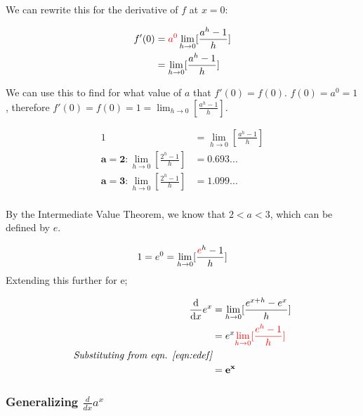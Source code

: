 \documentclass[12pt]{article}
\begin{document}
We can rewrite this for the derivative of $f$ at $x = 0$:

\begin{equation}\label{eqn:expderiv}
    \begin{split}
    f'(0) &= \textcolor{red}{a^0}\lim_{h\to 0}[\frac{a^h-1}{h}]\\
    &=\lim_{h\to 0}[\frac{a^h-1}{h}]
    \end{split}
\end{equation}

We can use this to find for what value of $a$ that $f'(0) = f(0)$. $f(0) = a^0 = 1$, therefore $f'(0) = f(0) = 1 = \lim_{h\to 0}[\frac{a^h-1}{h}]$.

\begin{equation}
    \begin{split}
        1 &= \lim_{h\to 0}[\frac{a^h-1}{h}]\\
        \mathbf{a = 2:} \lim_{h\to 0}[\frac{2^h-1}{h}] &= 0.693...\\
        \mathbf{a = 3:} \lim_{h\to 0}[\frac{2^h-1}{h}] &= 1.099...\\
    \end{split}
\end{equation}

By the Intermediate Value Theorem, we know that $2 < a < 3$, which can be defined by $e$.

\begin{equation}\label{eqn:edef}
    \begin{split}
        1 = e^0 = \lim_{h\to 0}[\frac{\textcolor{red}{e}^h-1}{h}]
    \end{split}
\end{equation}
Extending this further for e;

\begin{equation}\label{exp:fullexpderiv}
    \begin{split}
        \frac{\text{d}}{\text{d}x} e^x &= \lim_{h\to 0}[\frac{e^{x+h}-e^x}{h}]\\
        &= e^x \textcolor{red}{\lim_{h\to 0}[\frac{e^h-1}{h}]}\\
        \textit{Substituting from eqn. \ref{eqn:edef}}\\
        &= \mathbf{e^x}
    \end{split}
\end{equation}

\subsubsection{Generalizing \texorpdfstring{$\frac{d}{dx} a^x$}{the derivative of exponential functions}}
\end{document}
